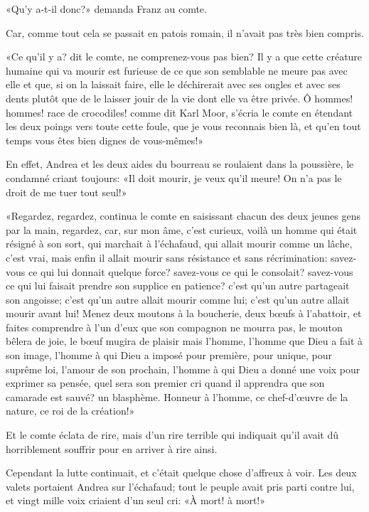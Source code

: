 «Qu'y a-t-il donc?» demanda Franz au comte. 

Car, comme tout cela se passait en patois romain, il n'avait pas très bien compris. 

«Ce qu'il y a? dit le comte, ne comprenez-vous pas bien? Il y a que cette créature humaine qui va mourir est furieuse de ce que son semblable ne meure pas avec elle et que, si on la laissait faire, elle le déchirerait avec ses ongles et avec ses dents plutôt que de le laisser jouir de la vie dont elle va être privée. Ô hommes! hommes! race de crocodiles! comme dit Karl Moor, s'écria le comte en étendant les deux poings vers toute cette foule, que je vous reconnais bien là, et qu'en tout temps vous êtes bien dignes de vous-mêmes!» 

En effet, Andrea et les deux aides du bourreau se roulaient dans la poussière, le condamné criant toujours: «Il doit mourir, je veux qu'il meure! On n'a pas le droit de me tuer tout seul!»  

«Regardez, regardez, continua le comte en saisissant chacun des deux jeunes gens par la main, regardez, car, sur mon âme, c'est curieux, voilà un homme qui était résigné à son sort, qui marchait à l'échafaud, qui allait mourir comme un lâche, c'est vrai, mais enfin il allait mourir sans résistance et sans récrimination: savez-vous ce qui lui donnait quelque force? savez-vous ce qui le consolait? savez-vous ce qui lui faisait prendre son supplice en patience? c'est qu'un autre partageait son angoisse; c'est qu'un autre allait mourir comme lui; c'est qu'un autre allait mourir avant lui! Menez deux moutons à la boucherie, deux bœufs à l'abattoir, et faites comprendre à l'un d'eux que son compagnon ne mourra pas, le mouton bêlera de joie, le bœuf mugira de plaisir mais l'homme, l'homme que Dieu a fait à son image, l'homme à qui Dieu a imposé pour première, pour unique, pour suprême loi, l'amour de son prochain, l'homme à qui Dieu a donné une voix pour exprimer sa pensée, quel sera son premier cri quand il apprendra que son camarade est sauvé? un blasphème. Honneur à l'homme, ce chef-d'œuvre de la nature, ce roi de la création!» 

Et le comte éclata de rire, mais d'un rire terrible qui indiquait qu'il avait dû horriblement souffrir pour en arriver à rire ainsi. 

Cependant la lutte continuait, et c'était quelque chose d'affreux à voir. Les deux valets portaient Andrea sur l'échafaud; tout le peuple avait pris parti contre lui, et vingt mille voix criaient d'un seul cri: «À mort! à mort!» 


